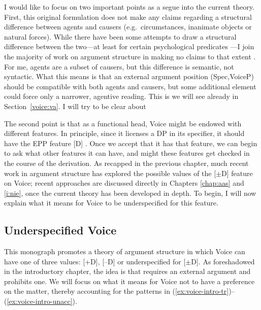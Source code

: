 I would like to focus on two important points as a segue into the current theory. First, this original formulation does not make any claims regarding a structural difference between agents and causers (e.g.~circumstances, inanimate objects or natural forces). While there have been some attempts to draw a structural difference between the two---at least for certain psychological predicates \citep{bellettirizzi88,harleystone13}---I join the majority of work on argument structure in making no claims to that extent \citep{layering15}. For me, agents are a subset of causers, but this difference is semantic, not syntactic. What this means is that an external argument position (Spec,VoiceP) should be compatible with both agents and causers, but some additional element could force only a narrower, agentive reading. This is we will see already in Section~\ref{voice:va}. I will try to be clear about 

The second point is that as a functional head, Voice might be endowed with different features. In principle, since it licenses a DP in its specifier, it should have the EPP feature [D] \citep{chomsky95}. Once we accept that it has that feature, we can begin to ask what other features it can have, and might these features get checked in the course of the derivation. As recapped in the previous chapter, much recent work in argument structure has explored the possible values of the [$\pm$D] feature on Voice; recent approaches are discussed directly in Chapters \ref{chap:aas} and \ref{i:nie}, once the current theory has been developed in depth. To begin, I will now explain what it means for Voice to be underspecified for this feature.

	\subsection{Underspecified Voice}
This monograph promotes a theory of argument structure in which Voice can have one of three values: [+D], [--D] or underspecified for [$\pm$D]. As foreshadowed in the introductory chapter, the idea is that {\vd} requires an external argument and {\vz} prohibits one. We will focus on what it means for Voice not to have a preference on the matter, thereby accounting for the patterns in (\ref{ex:voice-intro-tr})--(\ref{ex:voice-intro-unacc}).


